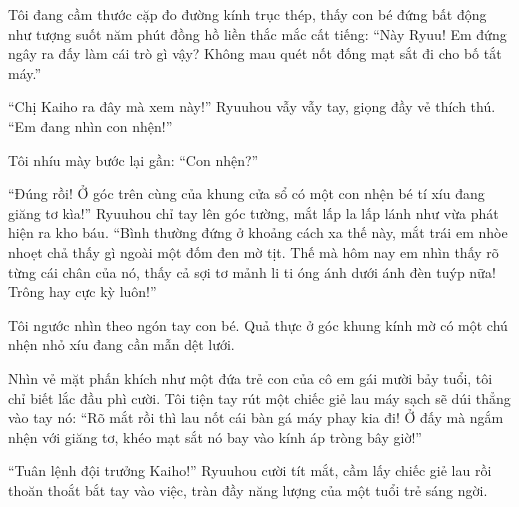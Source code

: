 ﻿\documentclass[../main.tex]{subfiles}
\begin{document}
Tôi đang cầm thước cặp đo đường kính trục thép, thấy con bé đứng bất động như tượng suốt năm phút đồng hồ liền thắc mắc cất tiếng: ``Này Ryuu! Em đứng ngây ra đấy làm cái trò gì vậy? Không mau quét nốt đống mạt sắt đi cho bố tắt máy.''

``Chị Kaiho ra đây mà xem này!'' Ryuuhou vẫy vẫy tay, giọng đầy vẻ thích thú. ``Em đang nhìn con nhện!''

Tôi nhíu mày bước lại gần: ``Con nhện?''

``Đúng rồi! Ở góc trên cùng của khung cửa sổ có một con nhện bé tí xíu đang giăng tơ kìa!'' Ryuuhou chỉ tay lên góc tường, mắt lấp la lấp lánh như vừa phát hiện ra kho báu. ``Bình thường đứng ở khoảng cách xa thế này, mắt trái em nhòe nhoẹt chả thấy gì ngoài một đốm đen mờ tịt. Thế mà hôm nay em nhìn thấy rõ từng cái chân của nó, thấy cả sợi tơ mảnh li ti óng ánh dưới ánh đèn tuýp nữa! Trông hay cực kỳ luôn!''

Tôi ngước nhìn theo ngón tay con bé. Quả thực ở góc khung kính mờ có một chú nhện nhỏ xíu đang cần mẫn dệt lưới.

Nhìn vẻ mặt phấn khích như một đứa trẻ con của cô em gái mười bảy tuổi, tôi chỉ biết lắc đầu phì cười. Tôi tiện tay rút một chiếc giẻ lau máy sạch sẽ dúi thẳng vào tay nó: ``Rõ mắt rồi thì lau nốt cái bàn gá máy phay kia đi! Ở đấy mà ngắm nhện với giăng tơ, khéo mạt sắt nó bay vào kính áp tròng bây giờ!''

``Tuân lệnh đội trưởng Kaiho!'' Ryuuhou cười tít mắt, cầm lấy chiếc giẻ lau rồi thoăn thoắt bắt tay vào việc, tràn đầy năng lượng của một tuổi trẻ sáng ngời.
\end{document}
